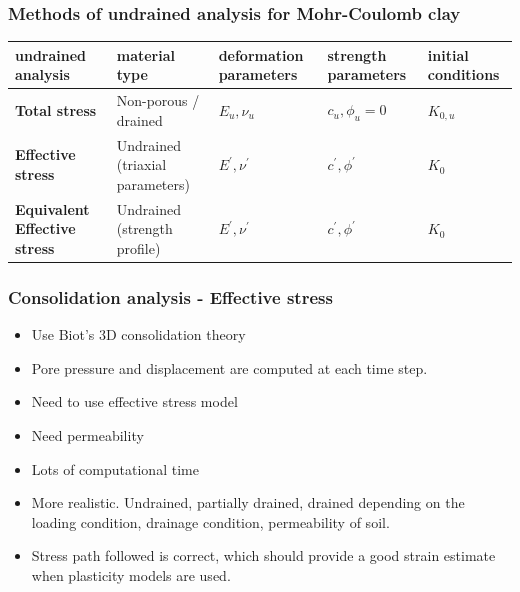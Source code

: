 \documentclass[notes]{beamer}
\begin{document}
\begin{frame}
\frametitle{Methods of undrained analysis for Mohr-Coulomb clay}
\begin{table}
	\begin{tabularx}{\textwidth}{XXXXX}
		\toprule
		\textbf{undrained analysis}          & \textbf{material type} & \textbf{deformation parameters} & \textbf{strength parameters} & \textbf{initial conditions} \\
		\midrule
		\textbf{Total stress}                           & Non-porous / drained   & $E_u, \nu_u$                    & $c_u, \phi_u = 0$            & $K_{0,u}$                   \\
		\midrule 
		\textbf{Effective stress} & Undrained (triaxial parameters)             & $E^\prime, \nu^\prime$          & $c^\prime, \phi^\prime$      & $K_0$                       \\
		\midrule
		\textbf{Equivalent Effective stress}    & Undrained (strength profile)           & $E^\prime, \nu^\prime$          & $c^\prime, \phi^\prime$      & $K_0$ \\    
		\bottomrule                 
	\end{tabularx}
\end{table}
\end{frame}

\begin{frame}
\frametitle{Consolidation analysis - Effective stress}
\begin{itemize}
	\item Use Biot's 3D consolidation theory
	\item Pore pressure and displacement are computed at each time step.
	\item Need to use effective stress model
	\item Need permeability
	\item Lots of computational time
	\item More realistic. Undrained, partially drained, drained depending on the loading condition, drainage condition, permeability of soil.
	\item Stress path followed is correct, which should provide a good strain estimate when plasticity models are used.
\end{itemize}
\end{frame}

\end{document}
